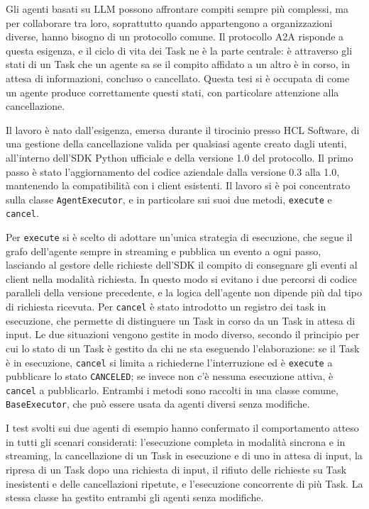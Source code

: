 Gli agenti basati su LLM possono affrontare compiti sempre più complessi, ma per collaborare tra loro, soprattutto quando appartengono a organizzazioni diverse, hanno bisogno di un protocollo comune. Il protocollo A2A risponde a questa esigenza, e il ciclo di vita dei Task ne è la parte centrale: è attraverso gli stati di un Task che un agente sa se il compito affidato a un altro è in corso, in attesa di informazioni, concluso o cancellato. Questa tesi si è occupata di come un agente produce correttamente questi stati, con particolare attenzione alla cancellazione.

Il lavoro è nato dall'esigenza, emersa durante il tirocinio presso HCL Software, di una gestione della cancellazione valida per qualsiasi agente creato dagli utenti, all'interno dell'SDK Python ufficiale e della versione 1.0 del protocollo. Il primo passo è stato l'aggiornamento del codice aziendale dalla versione 0.3 alla 1.0, mantenendo la compatibilità con i client esistenti. Il lavoro si è poi concentrato sulla classe \texttt{AgentExecutor}, e in particolare sui suoi due metodi, \texttt{execute} e \texttt{cancel}.

Per \texttt{execute} si è scelto di adottare un'unica strategia di esecuzione, che segue il grafo dell'agente sempre in streaming e pubblica un evento a ogni passo, lasciando al gestore delle richieste dell'SDK il compito di consegnare gli eventi al client nella modalità richiesta. In questo modo si evitano i due percorsi di codice paralleli della versione precedente, e la logica dell'agente non dipende più dal tipo di richiesta ricevuta. Per \texttt{cancel} è stato introdotto un registro dei task in esecuzione, che permette di distinguere un Task in corso da un Task in attesa di input. Le due situazioni vengono gestite in modo diverso, secondo il principio per cui lo stato di un Task è gestito da chi ne sta eseguendo l'elaborazione: se il Task è in esecuzione, \texttt{cancel} si limita a richiederne l'interruzione ed è \texttt{execute} a pubblicare lo stato \texttt{CANCELED}; se invece non c'è nessuna esecuzione attiva, è \texttt{cancel} a pubblicarlo. Entrambi i metodi sono raccolti in una classe comune, \texttt{BaseExecutor}, che può essere usata da agenti diversi senza modifiche.

I test svolti sui due agenti di esempio hanno confermato il comportamento atteso in tutti gli scenari considerati: l'esecuzione completa in modalità sincrona e in streaming, la cancellazione di un Task in esecuzione e di uno in attesa di input, la ripresa di un Task dopo una richiesta di input, il rifiuto delle richieste su Task inesistenti e delle cancellazioni ripetute, e l'esecuzione concorrente di più Task. La stessa classe ha gestito entrambi gli agenti senza modifiche.

